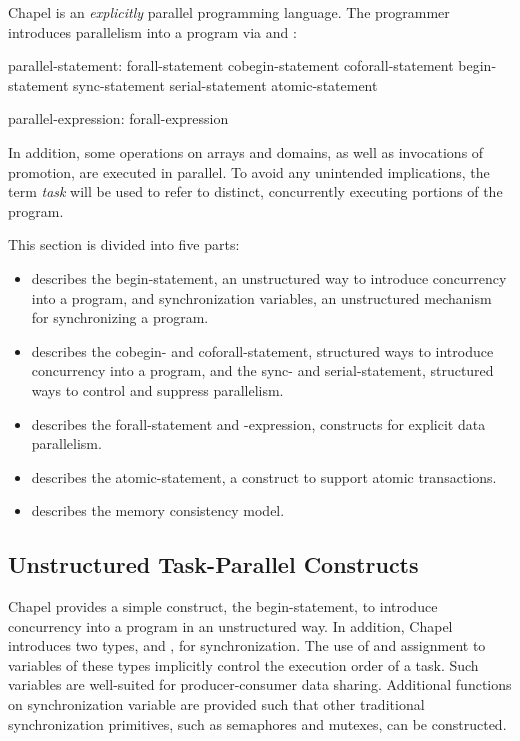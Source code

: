 \label{Parallelism_and_Synchronization}

Chapel is an {\em explicitly} parallel programming language.  The
programmer introduces parallelism into a program
via  and :
\begin{syntax}
parallel-statement:
  forall-statement
  cobegin-statement
  coforall-statement
  begin-statement
  sync-statement
  serial-statement
  atomic-statement

parallel-expression:
  forall-expression
\end{syntax}

In addition, some operations on arrays and domains, as well as
invocations of promotion, are executed in parallel.  To avoid any
unintended implications, the term \emph{task} will be used to refer to
distinct, concurrently executing portions of the program.

This section is divided into five parts:
\begin{itemize}
\item {}
describes the begin-statement, an unstructured way to introduce
concurrency into a program, and synchronization variables, an
unstructured mechanism for synchronizing a program.
\item {}
describes the cobegin- and coforall-statement, structured ways to
introduce concurrency into a program, and the sync- and
serial-statement, structured ways to control and suppress parallelism.
\item {}
describes the forall-statement and -expression, constructs for
explicit data parallelism.
\item {}
describes the atomic-statement, a construct to support atomic
transactions.
\item {}
describes the memory consistency model.
\end{itemize}

\subsection{Unstructured Task-Parallel Constructs}
\label{unstructured_task_parallelism}

Chapel provides a simple construct, the begin-statement, to introduce
concurrency into a program in an unstructured way.  In addition,
Chapel introduces two types,  and , for
synchronization.  The use of and assignment to variables of these
types implicitly control the execution order of a task.  Such
variables are well-suited for producer-consumer data sharing.
Additional functions on synchronization variable are provided such
that other traditional synchronization primitives, such as semaphores
and mutexes, can be constructed.

